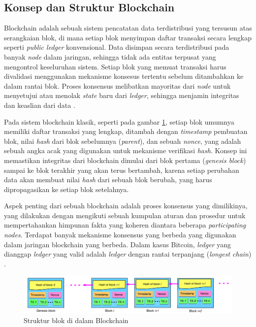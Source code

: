 \subsection{Konsep dan Struktur Blockchain}
\label{subsec:konsep-struktur-blockchain}

Blockchain adalah sebuah sistem pencatatan data terdistribusi yang tersusun atas serangkaian blok, di mana setiap blok menyimpan daftar transaksi secara lengkap seperti \textit{public ledger} konvensional. Data disimpan secara terdistribusi pada banyak \textit{node} dalam jaringan, sehingga tidak ada entitas terpusat yang mengontrol keseluruhan sistem. Setiap blok yang memuat transaksi harus divalidasi menggunakan mekanisme konsesus tertentu sebelum ditambahkan ke dalam rantai blok. Proses konsensus melibatkan mayoritas dari \textit{node} untuk menyetujui atau menolak \textit{state} baru dari \textit{ledger}, sehingga menjamin integritas dan keaslian dari data \parencite{zheng2018blockchain,nofer2017blockchain}.

Pada sistem blockchain klasik, seperti pada gambar \ref{image:struktur-blockchain}, setiap blok umumnya memiliki daftar transaksi yang lengkap, ditambah dengan \textit{timestamp} pembuatan blok, nilai \textit{hash} dari blok sebelumnya (\textit{parent}), dan sebuah \textit{nonce}, yang adalah sebuah angka acak yang digunakan untuk mekanisme verifikasi \textit{hash}.
Konsep ini memastikan integritas dari blockchain dimulai dari blok pertama (\textit{genesis block}) sampai ke blok terakhir yang akan terus bertambah, karena setiap perubahan data akan membuat nilai \textit{hash} dari sebuah blok berubah, yang harus dipropagasikan ke setiap blok setelahnya.

Aspek penting dari sebuah blockchain adalah proses konsensus yang dimilikinya, yang dilakukan dengan mengikuti sebuah kumpulan aturan dan prosedur untuk mempertahankan himpunan fakta yang koheren diantara beberapa \textit{participating nodes}. Terdapat banyak mekanisme konsensus yang berbeda yang digunakan dalam jaringan blockchain yang berbeda. Dalam kasus Bitcoin, \textit{ledger} yang dianggap \textit{ledger} yang valid adalah \textit{ledger} dengan rantai terpanjang (\textit{longest chain}) \parencite{swanson2015consensus}.

\begin{figure}[ht]
	\centering
	\includegraphics[width=1\textwidth]{resources/chapter-2/struktur-blockchain.png}
	\caption{Struktur blok di dalam Blockchain \parencite{zheng2018blockchain}}
	\label{image:struktur-blockchain}
\end{figure}


